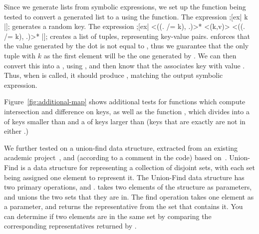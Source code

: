 Since we generate lists from symbolic expressions,
we set up the function being tested to convert a generated list to a  using the 
 function. The expression \hskin;[ex| k |]; generates a random key. 
The expression \hskin;[ex| <((. /= k), .)>* <(k,v)> <((. /= k), .)>* |]; 
creates a list of tuples, representing key-value pairs.
 enforces that the value generated by the dot is not equal to ,
thus we guarantee that the only tuple with $k$ as the first element will be the one generated
by .
We can then convert this into a , using ,
and then know that the  associates key  with value .
Thus, when  is called,
it should produce ,
matching the output symbolic expression.

Figure~\ref{fig:additional-map} shows additional
tests for  functions which compute intersection and difference on keys,
as well as the function ,
which divides  into a  of keys smaller than 
and a  of keys larger than 
(keys that are exactly  are not in either .)


We further tested \ourDSL on a union-find data structure,
extracted from an existing academic project~\cite{hallahan2019lazy},
and (according to a comment in the code) based on~\cite{conchon2007persistent}.
Union-Find is a data structure for representing a collection of disjoint sets, 
with each set being assigned one element to represent it.
The Union-Find data structure has two primary operations,  and .
 takes two elements of the structure as parameters, and unions the two sets that they are in.
The find operation takes one element as a parameter, and returns the representative from the set that contains it.
You can determine if two elements are in the same set by comparing the corresponding representatives returned by .


